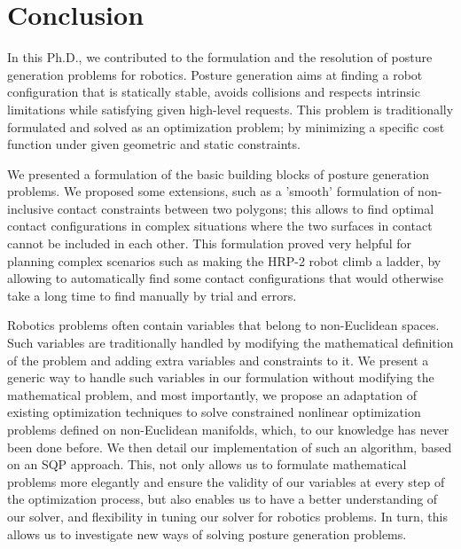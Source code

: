 

\chapter*{Conclusion}
\label{cha:conclusion}

In this Ph.D., we contributed to the formulation and the resolution of posture generation problems for robotics.
Posture generation aims at finding a robot configuration that is statically stable, avoids collisions and respects intrinsic limitations while satisfying given high-level requests.
This problem is traditionally formulated and solved as an optimization problem; by minimizing a specific cost function under given geometric and static constraints.

We presented a formulation of the basic building blocks of posture generation problems.
We proposed some extensions, such as a 'smooth' formulation of non-inclusive contact constraints between two polygons; this allows to find optimal contact configurations in complex situations where the two surfaces in contact cannot be included in each other.
This formulation proved very helpful for planning complex scenarios such as making the HRP-2 robot climb a ladder, by allowing to automatically find some contact configurations that would otherwise take a long time to find manually by trial and errors.

Robotics problems often contain variables that belong to non-Euclidean spaces.
Such variables are traditionally handled by modifying the mathematical definition of the problem and adding extra variables and constraints to it.
We present a generic way to handle such variables in our formulation without modifying the mathematical problem, and most importantly, we propose an adaptation of existing optimization techniques to solve constrained nonlinear optimization problems defined on non-Euclidean manifolds, which, to our knowledge has never been done before.
We then detail our implementation of such an algorithm, based on an SQP approach.
This, not only allows us to formulate mathematical problems more elegantly and ensure the validity of our variables at every step of the optimization process, but also enables us to have a better understanding of our solver, and flexibility in tuning our solver for robotics problems.
In turn, this allows us to investigate new ways of solving posture generation problems.

